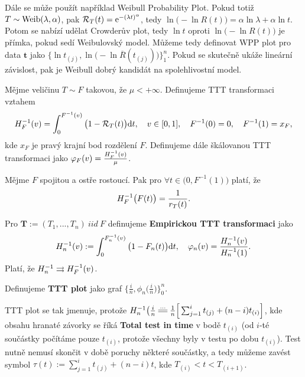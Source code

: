 Dále se může použít například Weibull Probability Plot. Pokud totiž $T\sim\mathrm{Weib}(\lambda,\alpha)$, pak $\mathcal{R}_T(t)=\mathrm{e}^{-(\lambda t)^\alpha}$, tedy $\ln\big(-\ln R(t)\big)=\alpha\ln\lambda+\alpha\ln t$. Potom se nabízí udělat Crowderův plot, tedy $\ln t$ oproti $\ln\big(-\ln R(t)\big)$ je přímka, pokud sedí Weibulovský model. Můžeme tedy definovat WPP plot pro data $\textbf{t}$ jako $\big\{\ln t_{(j)},\ln\big(-\ln \overline{R}(t_{(j)})\big)\}_1^n$. Pokud se skutečně ukáže lineární závislost, pak je Weibull dobrý kandidát na spolehlivostní model.


\begin{define}
	Mějme veličinu $T\sim F$ takovou, že $\mu<+\infty$. Definujeme TTT transformaci vztahem $$ H_F^{-1}(v)=\int_{0}^{F^{-1}(v)}\big(1-\mathcal{R}_T(t)\big)\mathrm{d} t,\quad v\in[0,1],\quad F^{-1}(0)=0,\quad F^{-1}(1)=x_F,$$
	kde $x_F$ je pravý krajní bod rozdělení $F$. Definujeme dále škálovanou TTT transformaci jako $\varphi_F(v)=\frac{H_F^{-1}(v)}{\mu}$.
\end{define}


\begin{theorem}
	Mějme $F$ spojitou a ostře rostoucí. Pak pro $\forall t\in\big(0,F^{-1}(1)\big)$ platí, že $$H_F^{-1}\big(F(t)\big)=\frac{1}{r_T(t)}.$$
\end{theorem}

\begin{define}
	Pro $\textbf{T}:=(T_1,...,T_n)~iid~F$ definujeme \textbf{Empirickou TTT transformaci} jako
	$$ H_n^{-1}(v):=\int_{0}^{F_n^{-1}(v)}\big(1-F_n(t)\big)\mathrm{d} t,\quad \varphi_n(v)=\frac{H_n^{-1}(v)}{H_n^{-1}(1)}. $$
	Platí, že $H_n^{-1}\rightrightarrows H_F^{-1}(v)$.
\end{define}

\begin{define}
	Definujeme \textbf{TTT plot} jako graf $\Big\{\frac{i}{n},\phi_n\big(\frac{i}{n}\big)\Big\}_0^n$.
\end{define}

TTT plot se tak jmenuje, protože $\inv{H_n}\big(\frac{i}{n}\equal{...}\frac{1}{n}\Big[\sum_{j=1}^i t_{(j)}+(n-i)t_{(i)}\Big]$, kde obsahu hranaté závorky se říká \textbf{Total test in time} v bodě $t_{(i)}$ (od $i$-té součástky počítáme pouze $t_{(i)}$, protože všechny byly v testu po dobu $t_{(i)}$). Test nutně nemusí skončit v době poruchy některé součástky, a tedy můžeme zavést symbol $\tau(t):=\sum_{j=1}^it_{(j)}+(n-i)t$, kde $T_{(i)}<t<T_{(i+1)}$.

